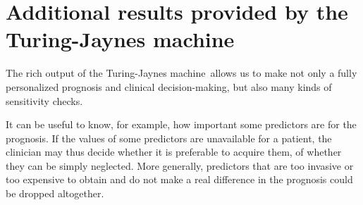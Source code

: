 \documentclass[utf8]{FrontiersinHarvard} %
\renewcommand*{\|}[1][]{\nonscript\:#1\vert\nonscript\:\mathopen{}}
\newcommand*{\tjm}{Turing-Jaynes machine}
\begin{document}
 




\newpage
\section{Additional results provided by the \tjm}
\label{sec:additional_results}

The rich output of the \tjm\ allows us to make not only a fully personalized prognosis and clinical decision-making, but also many kinds of sensitivity checks.

It can be useful to know, for example, how important some predictors are for the prognosis. If the values of some predictors are unavailable for a patient, the clinician may thus decide whether it is preferable to acquire them, of whether they can be simply neglected. More generally, predictors that are too invasive or too expensive to obtain and do not make a real difference in the prognosis could be dropped altogether.
\end{document}
